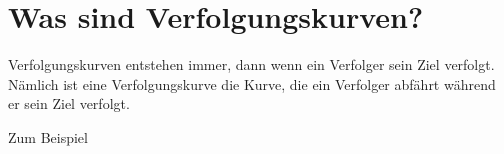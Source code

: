 %
%
%
\section{Was sind Verfolgungskurven? \label{lambertw:section:teil0}}


Verfolgungskurven entstehen immer, dann wenn ein Verfolger sein Ziel verfolgt.
Nämlich ist eine Verfolgungskurve die Kurve, die ein Verfolger abfährt während er sein Ziel verfolgt.

Zum Beispiel 




